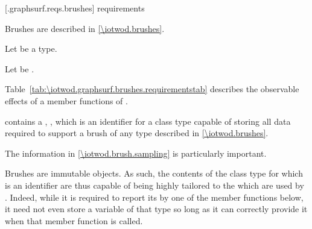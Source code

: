  [\iotwod.graphsurf.reqs.brushes]{ requirements}

\pnum
Brushes are described in \ref{\iotwod.brushes}.

\pnum
Let  be a \graphicssurfacestemplparam type.

\pnum
Let  be .

\pnum
Table~\ref{tab:\iotwod.graphsurf.brushes.requirementstab} describes the observable effects of a member functions of .

\pnum
{} contains a , 
, which is an identifier for a class type capable of
storing all data required to support a brush of any type described in
\ref{\iotwod.brushes}. \begin{note}
The information in \ref{\iotwod.brush.sampling} is particularly important.
\end{note}

\pnum
\begin{note}
Brushes are immutable objects. As such, the contents of the class type for which  is an identifier are thus capable of being highly tailored to the \underlyingrendandpresenttechs which are used by . Indeed, while it is required to report its  by one of the member functions below, it need not even store a variable of that type so long as it can correctly provide it when that member function is called.
\end{note}

